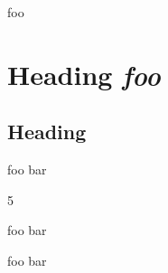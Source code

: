 
\def\mytitle{Basic Blocks}


foo

\part{Heading \emph{foo}}
\label{headingfoo}

\chapter{Heading}
\label{heading}

foo
bar

5

foo
bar

foo
bar


